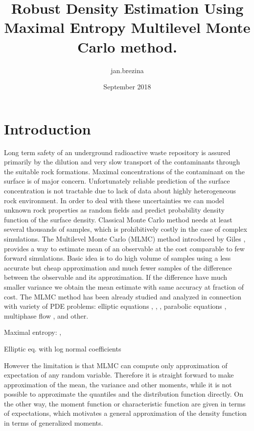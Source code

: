 \documentclass{article}
\title{Robust Density Estimation Using Maximal Entropy Multilevel Monte Carlo method. }
\author{jan.brezina }
\date{September 2018}
\begin{document}
\maketitle

\section{Introduction}
Long term safety of an underground radioactive waste repository is assured primarily by the dilution and 
very slow transport of the contaminants through the suitable rock formations. Maximal concentrations of the contaminant on the surface is of major concern. Unfortunately reliable prediction of the surface concentration is not tractable due to lack of data about highly heterogeneous rock environment. In order to deal with these uncertainties we can model unknown rock properties as random fields and predict probability density function of the surface density. 
Classical Monte Carlo method needs at least several thousands of samples, which is prohibitively costly in the case of complex simulations. The Multilevel Monte Carlo (MLMC) method introduced by Giles \cite{Giles2008}, \cite{Giles2015} provides a way to estimate mean of an observable at the cost comparable to few forward simulations. Basic idea is to do high volume of samples using a less accurate but cheap approximation and much fewer samples of the difference between the observable and its approximation. If the difference have much smaller variance we obtain the mean estimate with same accuracy at fraction of cost.  The MLMC method has been already studied and analyzed in connection with variety of PDE problems: elliptic equations \cite{Barth2011a}, \cite{Cliffe2011a}, \cite{Abdulle2013}, parabolic equations \cite{Barth2013},
multiphase flow \cite{Muller2013}, \cite{Lu2016} and other.


Maximal entropy:
\cite{Barron1991}, \cite{Bierig2016a}

Elliptic eq. with log normal coefficients \cite{Graham2015}






 However the limitation is that MLMC can compute only approximation of expectation of any random variable. Therefore it is straight forward to make approximation of the mean, the variance and other moments, while it is not possible to approximate the quantiles and the distribution function directly. On the other way, the moment function or characteristic function are given in terms of expectations, which motivates a general approximation of the density function in terms of generalized moments.
\end{document}
